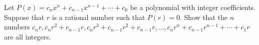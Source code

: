 Let $P(x)=c_nx^n+c_{n-1}x^{n-1}+\cdots+c_0$ be a polynomial with integer coefficients. Suppose that $r$ is a rational number such that $P(r)=0$. Show that the $n$ numbers
$c_nr, c_nr^2+c_{n-1}r, c_nr^3+c_{n-1}r^2+c_{n-1}r, \dots, c_nr^n+c_{n-1}r^{n-1}+\cdots+c_1r$
are all integers.